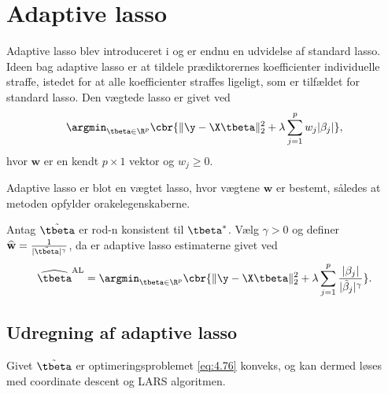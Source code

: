 \section{Adaptive lasso}
Adaptive lasso blev introduceret i \citep{adaptive_lasso} og er endnu en udvidelse af standard lasso.
Ideen bag adaptive lasso er at tildele prædiktorernes koefficienter individuelle straffe, istedet for at alle koefficienter straffes ligeligt, som er tilfældet for standard lasso.
Den vægtede lasso er givet ved
\begin{align*}
\argmin_{\tbeta \in \R^p} \cbr{\Vert \y - \X \tbeta \Vert_2^2 + \lambda \sum_{j=1}^p w_j \vert \beta_j \vert},
\end{align*}
hvor \(\mathbf{w}\) er en kendt \(p \times 1\) vektor og \(w_j \geq 0\).

Adaptive lasso er blot en vægtet lasso, hvor vægtene \(\mathbf{w}\) er bestemt, således at metoden opfylder orakelegenskaberne.
\begin{defn}
Antag \(\tilde{\tbeta}\) er rod-n konsistent til \(\tbeta^*\).
Vælg \(\gamma>0\) og definer \(\widehat{\mathbf{w}} = \frac{1}{\vert \tilde{\tbeta} \vert^\gamma}\), da er adaptive lasso estimaterne givet ved
\begin{align}
\widehat{\tbeta}^\text{AL} = \argmin_{\tbeta \in \R^p} \cbr{ \Vert \y - \X \tbeta \Vert_2^2 + \lambda \sum_{j=1}^p \frac{ \vert \beta_j \vert}{\vert \tilde{\beta}_j \vert^\gamma}}. \label{eq:4.76}
\end{align}
\end{defn}

\subsection{Udregning af adaptive lasso}
Givet \(\tilde{\tbeta}\) er optimeringsproblemet \eqref{eq:4.76} konveks, og kan dermed løses med coordinate descent og LARS algoritmen.
